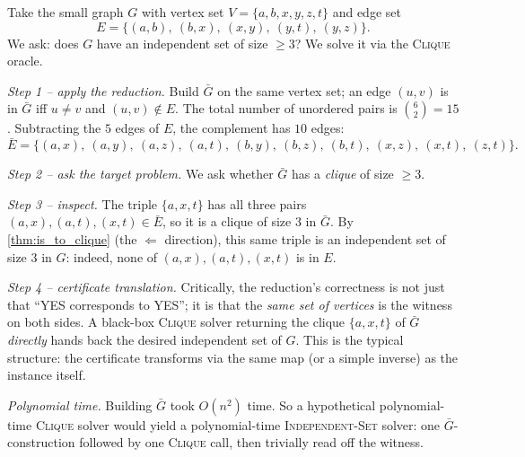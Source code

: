 \begin{example}
\label{ex:reduction_walkthrough}
Take the small graph $G$ with vertex set $V = \{a, b, x, y, z, t\}$ and edge set
\[
  E = \{(a, b),\ (b, x),\ (x, y),\ (y, t),\ (y, z)\}.
\]
We ask: does $G$ have an independent set of size $\ge 3$? We solve it via the \textsc{Clique} oracle.

\medskip
\noindent\textit{Step 1 -- apply the reduction.} Build $\bar G$ on the same vertex set; an edge $(u, v)$ is in $\bar G$ iff $u \ne v$ and $(u, v) \notin E$. The total number of unordered pairs is $\binom{6}{2} = 15$. Subtracting the $5$ edges of $E$, the complement has $10$ edges:
\[
  \bar E = \{(a,x),\ (a,y),\ (a,z),\ (a,t),\ (b,y),\ (b,z),\ (b,t),\ (x,z),\ (x,t),\ (z,t)\}.
\]

\medskip
\noindent\textit{Step 2 -- ask the target problem.} We ask whether $\bar G$ has a \emph{clique} of size $\ge 3$.

\medskip
\noindent\textit{Step 3 -- inspect.} The triple $\{a, x, t\}$ has all three pairs $(a,x), (a,t), (x,t) \in \bar E$, so it is a clique of size $3$ in $\bar G$. By \cref{thm:is_to_clique} (the $\Leftarrow$ direction), this same triple is an independent set of size $3$ in $G$: indeed, none of $(a,x), (a,t), (x,t)$ is in $E$.

\medskip
\noindent\textit{Step 4 -- certificate translation.} Critically, the reduction's correctness is not just that ``YES corresponds to YES''; it is that the \emph{same set of vertices} is the witness on both sides. A black-box \textsc{Clique} solver returning the clique $\{a, x, t\}$ of $\bar G$ \emph{directly} hands back the desired independent set of $G$. This is the typical structure: the certificate transforms via the same map (or a simple inverse) as the instance itself.

\medskip
\noindent\textit{Polynomial time.} Building $\bar G$ took $O(n^2)$ time. So a hypothetical polynomial-time \textsc{Clique} solver would yield a polynomial-time \textsc{Independent-Set} solver: one $\bar G$-construction followed by one \textsc{Clique} call, then trivially read off the witness.
\end{example}

